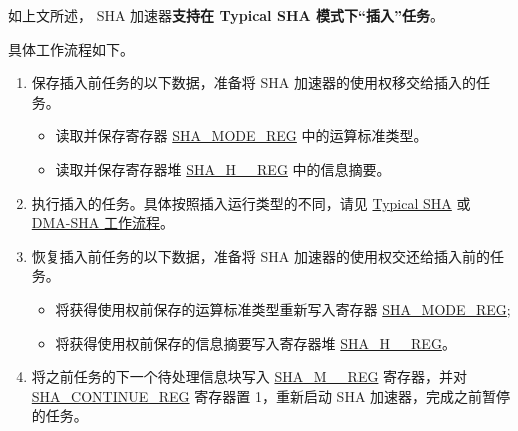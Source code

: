 \label{others:sha-interleaved} 如上文所述，\chipname{} SHA 加速器\textbf{支持在 Typical SHA 模式下“插入”任务}。

具体工作流程如下。

\begin{enumerate}
    \item 保存插入前任务的以下数据，准备将 SHA 加速器的使用权移交给插入的任务。
        \begin{itemize}
            \item 读取并保存寄存器 \hyperref[regdesc:SHAMODEREG]{SHA\_MODE\_REG} 中的运算标准类型。
            \item 读取并保存寄存器堆 \hyperref[regdesc:SHAHNREG]{SHA\_H\_\_REG} 中的信息摘要。
        \end{itemize}
    \item 执行插入的任务。具体按照插入运行类型的不同，请见 \hyperref[sec:sha-typical-sha]{Typical SHA} 或 \hyperref[sec:sha-dma-sha]{DMA-SHA 工作流程}。
    \item 恢复插入前任务的以下数据，准备将 SHA 加速器的使用权交还给插入前的任务。
        \begin{itemize}
            \item 将获得使用权前保存的运算标准类型重新写入寄存器 \hyperref[regdesc:SHAMODEREG]{SHA\_MODE\_REG};
            \item 将获得使用权前保存的信息摘要写入寄存器堆 \hyperref[regdesc:SHAHNREG]{SHA\_H\_\_REG}。
        \end{itemize}
    \item 将之前任务的下一个待处理信息块写入 \hyperref[regdesc:SHAMNREG]{SHA\_M\_\_REG} 寄存器，并对 \hyperref[regdesc:SHACONTINUEREG]{SHA\_CONTINUE\_REG} 寄存器置 1，重新启动 SHA 加速器，完成之前暂停的任务。
\end{enumerate}